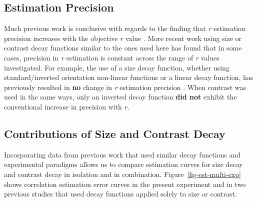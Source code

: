 \documentclass[manuscript, review, anonymous, screen]{acmart}
\begin{document}
\hypertarget{estimation-precision}{%
\subsection{Estimation Precision}\label{estimation-precision}}

Much previous work is conclusive with regards to the finding that
\emph{r} estimation precision increases with the objective \emph{r}
value
\citep{rensink_2010, rensink_2012, rensink_2014, rensink_2017, doherty_2007}.
More recent work using size or contrast decay functions similar to the
ones used here \citep{strain_2023, strain_2023b} has found that in some
cases, precision in \emph{r} estimation is constant across the range of
\emph{r} values investigated. For example, the use of a size decay
function, whether using standard/inverted orientation non-linear
functions or a linear decay function, has previously resulted in
\textbf{no} change in \emph{r} estimation precision
\citep{strain_2023b}. When contrast was used in the same ways, only an
inverted decay function \textbf{did not} exhibit the conventional
increase in precision with \emph{r}.

\hypertarget{contributions-of-size-and-contrast-decay}{%
\subsection{Contributions of Size and Contrast
Decay}\label{contributions-of-size-and-contrast-decay}}

Incorporating data from previous work \citep{strain_2023, strain_2023b}
that used similar decay functions and experimental paradigms allows us
to compare estimation curves for size decay and contrast decay in
isolation and in combination. Figure~\ref{fig-est-multi-exp} shows
correlation estimation error curves in the present experiment and in two
previous studies that used decay functions applied solely to size or
contrast.
\end{document}
